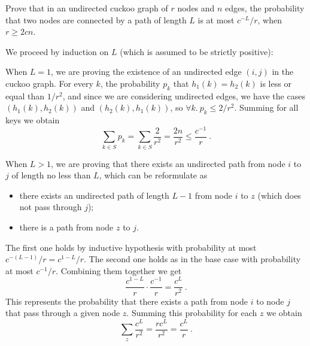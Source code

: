 \exercise

Prove that in an undirected cuckoo graph of $r$ nodes and $n$ edges, the
probability that two nodes are connected by a path of length $L$ is at most
$c^{-L}/r$, when $r \ge 2cn$.

\solution

We proceed by induction on $L$ (which is assumed to be strictly positive):
%
\begin{description}[labelindent=0.5cm, leftmargin=1cm]

  \item[\bf Base case.] When $L = 1$, we are proving the existence of an
  undirected edge $(i, j)$ in the cuckoo graph. For every $k$, the probability
  $p_k$ that $h_1(k) = h_2(k)$ is less or equal than $1/r^2$, and since we are
  considering undirected edges, we have the cases $(h_1(k), h_2(k))$ and
  $(h_2(k), h_1(k))$, so $\forall k.\ p_k \le 2/r^2$. Summing for all keys we
  obtain $$\sum_{k \in S} p_k = \sum_{k \in S} \frac{2}{r^2} = \frac{2n}{r^2}
  \le  \frac{c^{-1}}{r}\ .$$

  \item[\bf Inductive case.] When $L > 1$, we are proving that there exists an
  undirected path from node $i$ to $j$ of length no less than $L$, which can be
  reformulate as
  \begin{itemize}

    \item there exists an undirected path of length $L - 1$ from node $i$ to $z$
    (which does not pass through $j$);

    \item there is a path from node $z$ to $j$.

  \end{itemize}
  The first one holds by inductive hypothesis with probability at most $c^{-(L -
  1)}/r = c^{1 - L}/r$. The second one holds as in the base case with
  probability at most $c^{-1}/r$. Combining them together we get $$\frac{c^{1 -
  L}}{r}\cdot\frac{c^{-1}}{r} = \frac{c^L}{r^2}\ .$$ This represents the
  probability that there exists a path from node $i$ to node $j$ that pass
  through a given node $z$. Summing this probability for each $z$ we obtain
  $$\sum_z \frac{c^L}{r^2} = \frac{rc^L}{r^2} = \frac{c^L}{r}\ .$$

\end{description}
